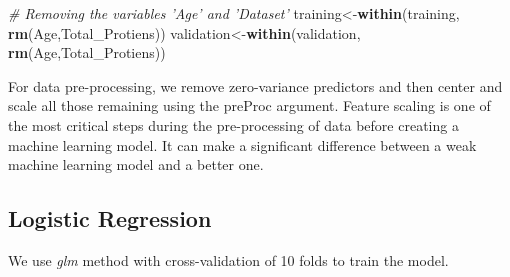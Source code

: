 \documentclass[]{article}
\newenvironment{Shaded}{\begin{snugshade}}{\end{snugshade}}
\newcommand{\CommentTok}[1]{\textcolor[rgb]{0.56,0.35,0.01}{\textit{#1}}}
\newcommand{\DataTypeTok}[1]{\textcolor[rgb]{0.13,0.29,0.53}{#1}}
\newcommand{\DecValTok}[1]{\textcolor[rgb]{0.00,0.00,0.81}{#1}}
\newcommand{\FloatTok}[1]{\textcolor[rgb]{0.00,0.00,0.81}{#1}}
\newcommand{\KeywordTok}[1]{\textcolor[rgb]{0.13,0.29,0.53}{\textbf{#1}}}
\newcommand{\NormalTok}[1]{#1}
\newcommand{\OperatorTok}[1]{\textcolor[rgb]{0.81,0.36,0.00}{\textbf{#1}}}
\newcommand{\StringTok}[1]{\textcolor[rgb]{0.31,0.60,0.02}{#1}}
\begin{document}
\begin{Shaded}
\begin{Highlighting}[]
\CommentTok{# Removing the variables 'Age' and 'Dataset' }
\NormalTok{training<-}\KeywordTok{within}\NormalTok{(training, }\KeywordTok{rm}\NormalTok{(Age,Total_Protiens))}
\NormalTok{validation<-}\KeywordTok{within}\NormalTok{(validation, }\KeywordTok{rm}\NormalTok{(Age,Total_Protiens))}
\end{Highlighting}
\end{Shaded}

For data pre-processing, we remove zero-variance predictors and then
center and scale all those remaining using the preProc argument. Feature
scaling is one of the most critical steps during the pre-processing of
data before creating a machine learning model. It can make a significant
difference between a weak machine learning model and a better one.

\subsection{Logistic Regression}

We use \emph{glm} method with cross-validation of 10 folds to train the
model.

\begin{Shaded}
\end{Shaded}
\end{document}
